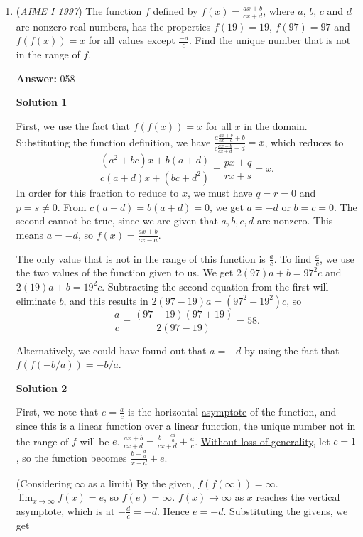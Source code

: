 \begin{enumerate}
	\item (\textit{AIME I 1997}) The function $f$ defined by $f(x)= \frac{ax+b}{cx+d}$, where $a$, $b$, $c$ and $d$ are nonzero real numbers, has the properties $f(19)=19$, $f(97)=97$ and $f(f(x))=x$ for all values except $\frac{-d}{c}$. Find the unique number that is not in the range of $f$.


 
 \textbf{Answer: }058



\textbf{Solution 1}

First, we use the fact that $f(f(x)) = x$ for all $x$ in the domain. Substituting the function definition, we have $\frac {a\frac {ax + b}{cx + d} + b}{c\frac {ax + b}{cx + d} + d} = x$, which reduces to
 \[\frac {(a^2 + bc)x + b(a + d)}{c(a + d)x + (bc + d^2)} =\frac {px + q}{rx + s} = x.\]In order for this fraction to reduce to $x$, we must have $q = r = 0$ and $p = s\not = 0$. From $c(a + d) = b(a + d) = 0$, we get $a = - d$ or $b = c = 0$. The second cannot be true, since we are given that $a,b,c,d$ are nonzero. This means $a = - d$, so $f(x) = \frac {ax + b}{cx - a}$.

 The only value that is not in the range of this function is $\frac {a}{c}$. To find $\frac {a}{c}$, we use the two values of the function given to us. We get $2(97)a + b = 97^2c$ and $2(19)a + b = 19^2c$. Subtracting the second equation from the first will eliminate $b$, and this results in $2(97 - 19)a = (97^2 - 19^2)c$, so
 \[\frac {a}{c} = \frac {(97 - 19)(97 + 19)}{2(97 - 19)} = 58 .\]

 Alternatively, we could have found out that $a = -d$ by using the fact that $f(f(-b/a))=-b/a$.

 



\textbf{Solution 2}

First, we note that $e = \frac ac$ is the horizontal \href{https://artofproblemsolving.com/wiki/index.php?title=Asymptote\_(Geometry)}{asymptote} of the function, and since this is a linear function over a linear function, the unique number not in the range of $f$ will be $e$. $\frac{ax+b}{cx+d} = \frac{b-\frac{cd}{a}}{cx+d} + \frac{a}{c}$. \href{https://artofproblemsolving.com/wiki/index.php?title=Without\_loss\_of\_generality}{Without loss of generality}, let $c=1$, so the function becomes $\frac{b- \frac{d}{a}}{x+d} + e$.  

 (Considering $\infty$ as a limit) By the given, $f(f(\infty)) = \infty$. $\lim_{x \rightarrow \infty} f(x) = e$, so $f(e) = \infty$. $f(x) \rightarrow \infty$ as $x$ reaches the vertical \href{https://artofproblemsolving.com/wiki/index.php?title=Asymptote\_(Geometry)}{asymptote}, which is at $-\frac{d}{c} = -d$. Hence $e = -d$. Substituting the givens, we get 


\end{enumerate}
